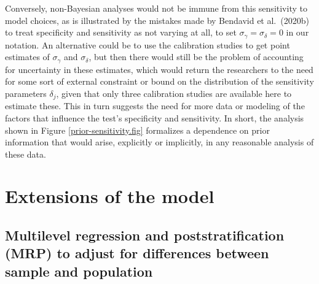 \documentclass[11pt]{article}
\begin{document}
Conversely, non-Bayesian analyses would not be immune from this sensitivity to model choices, as is illustrated by the mistakes made by Bendavid et al.\ (2020b) to treat specificity and sensitivity as not varying at all, to set $\sigma_{\gamma}=\sigma_{\delta}=0$ in our notation.  An alternative could be to use the calibration studies to get point estimates of $\sigma_{\gamma}$ and $\sigma_{\delta}$, but then there would still be the problem of accounting for uncertainty in these estimates, which would return the researchers to the need for some sort of external constraint or bound on the distribution of the sensitivity parameters $\delta_j$, given that only three calibration studies are available here to estimate these.  This in turn suggests the need for more data or modeling of the factors that influence the test's specificity and sensitivity.  In short, the analysis shown in Figure \ref{prior-sensitivity.fig} formalizes a dependence on prior information that would arise, explicitly or implicitly, in any reasonable analysis of these data.

\section{Extensions of the model}

\subsection{Multilevel regression and poststratification (MRP) to adjust for differences between sample and population}\label{mrp}
\end{document}
